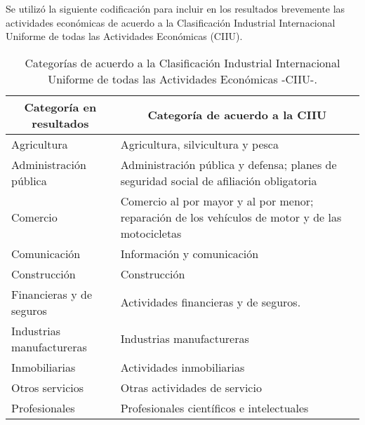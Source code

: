 \begin{description}
	\newpage
	Se utilizó la siguiente codificación para incluir en los resultados brevemente las actividades económicas de acuerdo a la Clasificación Industrial Internacional Uniforme de todas las Actividades Económicas (CIIU).
\begin{table}[ht]
	\begin{tabular}{|l|l|}
		\hline
		\multicolumn{1}{|c|}{\textbf{Categoría en resultados}} & \multicolumn{1}{c|}{\textbf{Categoría de acuerdo a la CIIU}}                                        \\ \hline
		Agricultura                                            & Agricultura, silvicultura y pesca                                                                \\ \hline
		Administración pública                                 & Administración pública y defensa; planes de seguridad social de afiliación obligatoria           \\ \hline
		Comercio                                               & Comercio al por mayor y al por menor; reparación de los vehículos de motor y de las motocicletas \\ \hline
		Comunicación                                           & Información y comunicación                                                                       \\ \hline
		Construcción                                           & Construcción                                                                                     \\ \hline
		Financieras y de seguros                               & Actividades financieras y de seguros.                                                            \\ \hline
		Industrias manufactureras                              & Industrias manufactureras                                                                        \\ \hline
		Inmobiliarias                                          & Actividades inmobiliarias                                                                        \\ \hline
		Otros servicios                                        & Otras actividades de servicio                                                                    \\ \hline
		Profesionales                                          & Profesionales científicos e intelectuales                                                        \\ \hline
	\end{tabular}
	\caption{Categorías de acuerdo a la Clasificación Industrial Internacional Uniforme de todas las Actividades Económicas -CIIU-.}
	\label{tab:categorias}
\end{table}
\end{description}                                                                                    